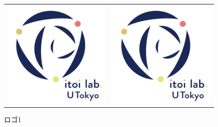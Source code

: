 \documentclass[11pt,a4j,onecolumn]{jsreport} %
\begin{document}
\begin{figure}[bp]
  \begin{tabular}{cc}
    \begin{minipage}[b]{0.45\hsize}
      \centering
      \includegraphics[keepaspectratio, width=45truemm]{figure/logo.png}
      \caption{ロゴ1}
      \label{fg:logo1}
    \end{minipage} &
    \begin{minipage}[b]{0.45\hsize}
      \centering
      \includegraphics[keepaspectratio, width=45truemm, angle=90]{figure/logo.png}

\end{minipage}
\end{tabular}
\end{figure}
\end{document}
